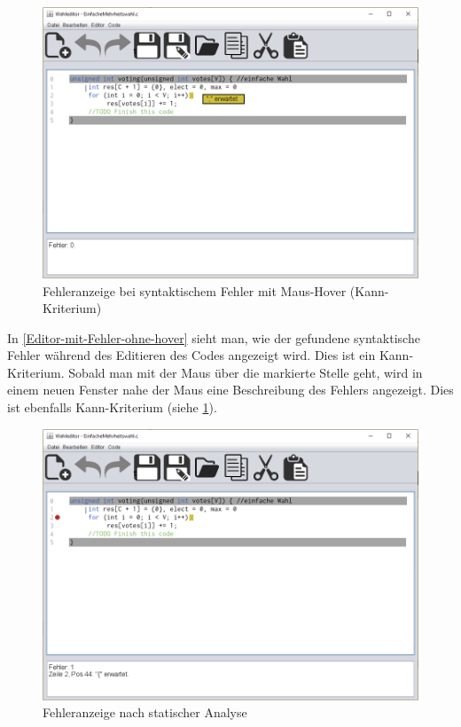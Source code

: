 \documentclass[a4paper]{scrreprt}
\begin{document}
\begin{figure}[H]
\includegraphics[scale=0.5]{Editor-mit-Fehler-mit-hover.png}
\caption{Fehleranzeige bei syntaktischem Fehler mit Maus-Hover (Kann-Kriterium)}
\label{Editor-mit-Fehler-mit-hover}
\end{figure}

In \ref{Editor-mit-Fehler-ohne-hover} sieht man, wie der gefundene syntaktische Fehler während des Editieren des Codes angezeigt wird. Dies ist ein Kann-Kriterium. Sobald man mit der Maus über die markierte Stelle geht, wird in einem neuen Fenster nahe der Maus eine Beschreibung des Fehlers angezeigt. Dies ist ebenfalls Kann-Kriterium (siehe \ref{Editor-mit-Fehler-mit-hover}).

\begin{figure}[H]
\includegraphics[scale=0.5]{Editor-mit-Fehler-nach-statischer-analyse.png}
\caption{Fehleranzeige nach statischer Analyse}
\label{Editor-mit-Fehler-nach-statischer-analyse}
\end{figure}
\end{document}
